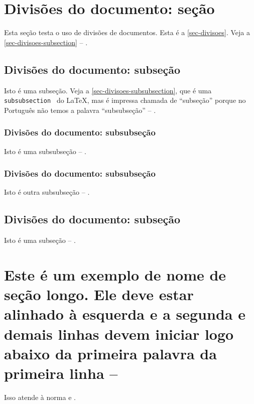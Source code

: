 \section{Divisões do documento: seção}\label{sec-divisoes}

Esta seção testa o uso de divisões de documentos. Esta é a
\autoref{sec-divisoes}. Veja a \autoref{sec-divisoes-subsection} -- \showfont.

\subsection{Divisões do documento: subseção}\label{sec-divisoes-subsection}

Isto é uma subseção. Veja a \autoref{sec-divisoes-subsubsection}, que é uma
\texttt{subsubsection  } do \LaTeX{}, mas é impressa chamada de ``subseção''
porque no Português não temos a palavra ``subsubseção'' -- \showfont.

\subsubsection{Divisões do documento: subsubseção}
\label{sec-divisoes-subsubsection}

Isto é uma subsubseção -- \showfont.

\subsubsection{Divisões do documento: subsubseção}

Isto é outra subsubseção -- \showfont.

\subsection{Divisões do documento: subseção}\label{sec-exemplo-subsec}

Isto é uma subseção -- \showfont.

\section[Exemplo muito longo]{Este é um exemplo de nome de seção longo. Ele deve
estar alinhado à esquerda e a segunda e demais linhas devem iniciar logo abaixo
da primeira palavra da primeira linha -- \showfont}

Isso atende à norma \textcite[seções de 5.2.2 a 5.2.4]{NBR14724:2011}
 e \textcite[seções de 3.1 a 3.8]{NBR6024:2012}.

